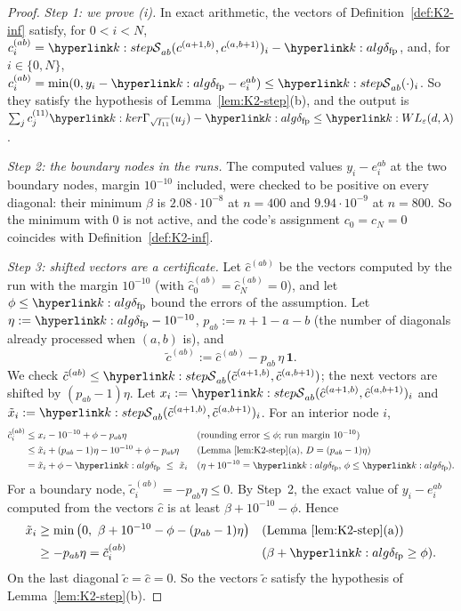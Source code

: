 \documentclass[11pt]{article}
\newcommand{\1}{\mathbf{1}}
\begin{document}
\begin{proof}
\textit{Step 1: we prove (i).} In exact arithmetic, the vectors of Definition~\ref{def:K2-inf} satisfy, for $0<i<N$,
$c^{(ab)}_i=\kS_{ab}(c^{(a+1,b)},c^{(a,b+1)})_i-\kdfp$, and, for $i\in\{0,N\}$, $c^{(ab)}_i=\min(0,y_i-\kdfp-e^{ab}_i)\le\kS_{ab}(\cdot)_i$. So they satisfy the hypothesis of
Lemma~\ref{lem:K2-step}(b), and the output is $\sum_jc^{(11)}_j\kGam_{\sqrt{I_{11}}}(u_j)-\kdfp\le\kL(d,\lambda)$.

\textit{Step 2: the boundary nodes in the runs.} The computed values $y_i-e^{ab}_i$ at the two boundary nodes, margin $10^{-10}$ included, were checked to be positive on
every diagonal: their minimum $\beta$ is $2.08\cdot10^{-8}$ at $n=400$ and $9.94\cdot10^{-9}$ at $n=800$. So the minimum with $0$ is not active, and the code's
assignment $c_0=c_N=0$ coincides with Definition~\ref{def:K2-inf}.

\textit{Step 3: shifted vectors are a certificate.} Let $\hat c^{(ab)}$ be the vectors computed by the run with the margin $10^{-10}$ (with $\hat c^{(ab)}_0=\hat c^{(ab)}_N=0$),
and let $\phi\le\kdfp$ bound the errors of the assumption. Let $\eta:=\kdfp-10^{-10}$, $p_{ab}:=n+1-a-b$ (the number of diagonals already processed when
$(a,b)$ is), and
\[
\tilde c^{(ab)}:=\hat c^{(ab)}-p_{ab}\,\eta\,\1 .
\]
We check $\tilde c^{(ab)}\le\kS_{ab}(\tilde c^{(a+1,b)},\tilde c^{(a,b+1)})$; the next vectors are shifted by $(p_{ab}-1)\eta$. Let
$x_i:=\kS_{ab}(\hat c^{(a+1,b)},\hat c^{(a,b+1)})_i$ and $\tilde x_i:=\kS_{ab}(\tilde c^{(a+1,b)},\tilde c^{(a,b+1)})_i$. For an interior node $i$,
\begin{align*}
\tilde c^{(ab)}_i
&\le x_i-10^{-10}+\phi-p_{ab}\eta && \text{(rounding error $\le\phi$; run margin $10^{-10}$)}\\
&\le\tilde x_i+(p_{ab}-1)\eta-10^{-10}+\phi-p_{ab}\eta && \text{(Lemma~\ref{lem:K2-step}(a), $D=(p_{ab}-1)\eta$)}\\
&=\tilde x_i+\phi-\kdfp\ \le\ \tilde x_i && \text{($\eta+10^{-10}=\kdfp$, $\phi\le\kdfp$)}.
\end{align*}
For a boundary node, $\tilde c^{(ab)}_i=-p_{ab}\eta\le0$. By Step~2, the exact value of $y_i-e^{ab}_i$ computed from the vectors $\hat c$ is at least $\beta+10^{-10}-\phi$. Hence
\begin{align*}
\tilde x_i
&\ge\min\big(0,\ \beta+10^{-10}-\phi-(p_{ab}-1)\eta\big) && \text{(Lemma~\ref{lem:K2-step}(a))}\\
&\ge-p_{ab}\eta=\tilde c^{(ab)}_i && \text{($\beta+\kdfp\ge\phi$)}.
\end{align*}
On the last diagonal $\tilde c=\hat c=0$. So the vectors $\tilde c$ satisfy the hypothesis of Lemma~\ref{lem:K2-step}(b).


\end{proof}
\end{document}
